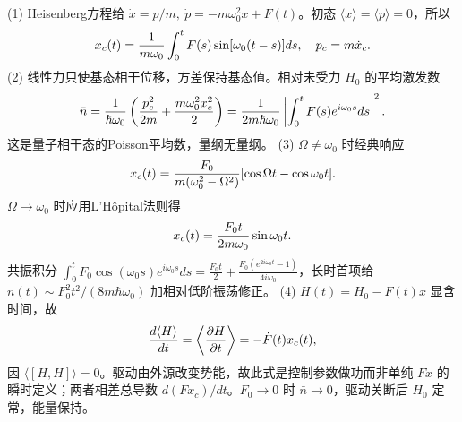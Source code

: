 (1) Heisenberg方程给 \(\dot x=p/m,\ \dot p=-m\omega_0^2x+F(t)\)。初态 \(\langle x\rangle=\langle p\rangle=0\)，所以
\[
x_c(t)={1\over m\omega_0}\int_0^tF(s)\sin[\omega_0(t-s)]ds,\quad p_c=m\dot x_c.
\]
(2) 线性力只使基态相干位移，方差保持基态值。相对未受力 \(H_0\) 的平均激发数
\[
\bar n={1\over\hbar\omega_0}\left({p_c^2\over2m}+{m\omega_0^2x_c^2\over2}\right)
={1\over2m\hbar\omega_0}\left|\int_0^tF(s)e^{i\omega_0s}ds\right|^2 .
\]
这是量子相干态的Poisson平均数，量纲无量纲。
(3) \(\Omega\ne\omega_0\) 时经典响应
\[
x_c(t)={F_0\over m(\omega_0^2-\Omega^2)}
[\cos\Omega t-\cos\omega_0t].
\]
\(\Omega\to\omega_0\) 时应用L'Hôpital法则得
\[
x_c(t)={F_0t\over2m\omega_0}\sin\omega_0t.
\]
共振积分 \(\int_0^tF_0\cos(\omega_0s)e^{i\omega_0s}ds
=\frac{F_0t}{2}+\frac{F_0(e^{2i\omega_0t}-1)}{4i\omega_0}\)，长时首项给
\(\bar n(t)\sim F_0^2t^2/(8m\hbar\omega_0)\) 加相对低阶振荡修正。
(4) \(H(t)=H_0-F(t)x\) 显含时间，故
\[
{d\langle H\rangle\over dt}=\left\langle{\partial H\over\partial t}\right\rangle
=-\dot F(t)x_c(t),
\]
因 \(\langle[H,H]\rangle=0\)。驱动由外源改变势能，故此式是控制参数做功而非单纯 \(F\dot x\) 的瞬时定义；两者相差总导数 \(d(Fx_c)/dt\)。\(F_0\to0\) 时 \(\bar n\to0\)，驱动关断后 \(H_0\) 定常，能量保持。
